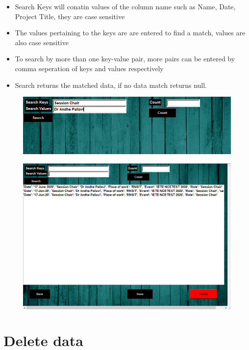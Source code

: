 \begin{itemize}
	\item Search Keys will conatin values of the column name such as Name, Date, Project Title, they are case sensitive
	\item The values pertaining to the keys are are entered to find a match, values are also case sensitive
	\item To search by more than one key-value pair, more pairs can be entered by comma seperation of keys and values respectively 
	\item Search returns the matched data, if no data match returns null.
\end{itemize}

\begin{figure}[H]
	\centering
	\includegraphics[width=0.8\linewidth]{"images/generation_qr_nqr/Screenshot (67)"}
	\label{fig:screenshot-67}
\end{figure}

\begin{figure}[H]
	\centering
	\includegraphics[width=0.88\linewidth]{"images/generation_qr_nqr/Screenshot (65)"}
	\label{fig:screenshot-65}
\end{figure}


\newpage
\section{Delete data}

